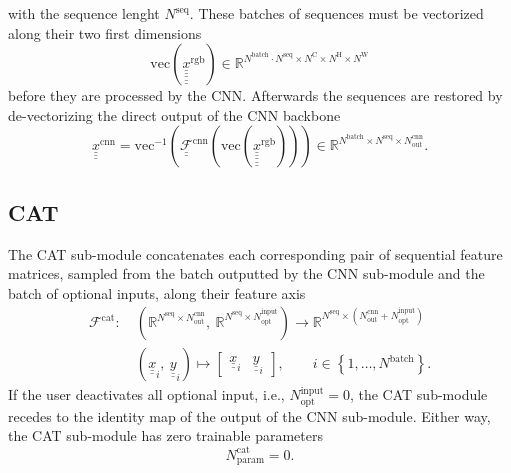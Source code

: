 with the sequence lenght $N^\text{seq}$.
These batches of sequences must be
vectorized along their two first dimensions
\begin{equation}
    \mathrm{vec} \left(
        \underline{\underline{\underline{\underline{\underline x}}}} ^\text{rgb}   
    \right)
    \in
    \mathbb{R}^{
        N^\text{batch} 
        \cdot
        N^\text{seq}
        \times
        N^\text{C}
        \times
        N^\text{H}
        \times
        N^\text{W}
    }
\end{equation}
before they are processed by the CNN.
Afterwards the sequences are restored 
by de-vectorizing the direct output of the CNN backbone 
\begin{equation}
    \underline{\underline{\underline{x}}}^\text{cnn}
    =
    \mathrm{vec}^{-1} \left(
        \underline{\underline{ \mathcal{F} }}^\text{cnn} \left(
            \mathrm{vec} \left(
                \underline{\underline{\underline{\underline{\underline x}}}} ^\text{rgb}   
            \right)
        \right)
    \right)
    \in
    \mathbb{R}^{
        N^\text{batch} 
        \times
        N^\text{seq}
        \times
        N^\text{cnn}_\text{out}
    }.
\end{equation}

\subsection*{CAT}
The CAT sub-module concatenates
each corresponding pair of sequential feature matrices,
sampled from 
the
batch outputted by the CNN sub-module
and the batch of optional inputs,
along their feature axis
\begin{align} \label{eq:cat}
    \mathcal{F}^\text{cat}
    :\ 
    & \left(
        \mathbb{R}^{
            N^\text{seq}
            \times
            N^\text{cnn}_{\text{out}}
        }
        ,\ 
        \mathbb{R}^{
            N^\text{seq}
            \times
            N^\text{input}_{\text{opt}}
        }
    \right)
    \rightarrow 
    \mathbb{R}^{
            N^\text{seq}
            \times
            \left(
                N^\text{cnn}_{\text{out}}
                + 
                N^\text{input}_{\text{opt}}
            \right)
        }
    \nonumber \\ &
    \left(
        \underline{\underline{x}}_{i}
        ,\ 
        \underline{\underline{y}}_{i}
    \right)
    \mapsto
    \begin{bmatrix}
        \underline{\underline{x}}_{i} & \underline{\underline{y}}_{i}
    \end{bmatrix} 
    ,\qquad
    i \in \left\{
        1, \dots, N^\text{batch}
    \right\}.
\end{align}
If the user deactivates all optional input, i.e.,
$
    N^\text{input}_{\text{opt}} = 0
$,
the CAT sub-module recedes to 
the identity map
of the output of the CNN sub-module.
Either way, 
the CAT sub-module has zero trainable parameters
\begin{equation}
    N^\text{cat}_\text{param} = 0.
\end{equation}


